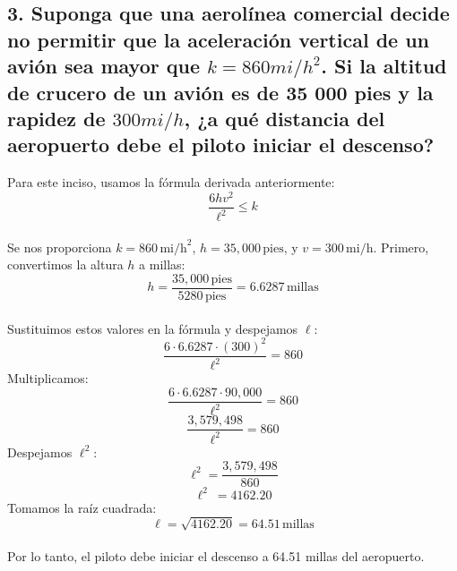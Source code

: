\documentclass[11pt,letterpaper]{article}
\begin{document}
\subsection*{3. 
Suponga que una aerolínea comercial decide no permitir que la aceleración vertical de un avión sea mayor que $k = 860 mi/h^2$. Si la altitud de crucero de un avión es de 35 000 pies y la rapidez de $300 mi/h$, ¿a qué distancia del aeropuerto debe el piloto iniciar el descenso?}
Para este inciso, usamos la fórmula derivada anteriormente:
\begin{equation*}
\frac{6hv^2}{\ell^2} \leq k
\end{equation*}
\\Se nos proporciona \( k = 860 \, \text{mi/h}^2 \), \( h = 35,000 \, \text{pies} \), y \( v = 300 \, \text{mi/h} \). Primero, convertimos la altura \( h \) a millas:
\begin{equation*}
h = \frac{35,000 \, \text{pies}}{5280 \, \text{pies}} = 6.6287
 \, \text{millas}
\end{equation*}
\\Sustituimos estos valores en la fórmula y despejamos \( \ell \):
\begin{equation*}
\frac{6 \cdot 6.6287
 \cdot (300)^2}{\ell^2} = 860
\end{equation*}
Multiplicamos:
\begin{equation*}
\frac{6 \cdot 6.6287
 \cdot 90,000}{\ell^2} = 860
\end{equation*}
\begin{equation*}
\frac{3,579,498}{\ell^2} = 860
\end{equation*}
Despejamos \( \ell^2 \):
\begin{equation*}
\ell^2 = \frac{3,579,498}{860}
\end{equation*}
\begin{equation*}
\ell^2\ = 4162.20
\end{equation*}
Tomamos la raíz cuadrada:
\begin{equation*}
\ell = \sqrt{4162.20} = 64.51 \, \text{millas}
\end{equation*}
\\Por lo tanto, el piloto debe iniciar el descenso a 64.51 millas del aeropuerto.
\end{document}
